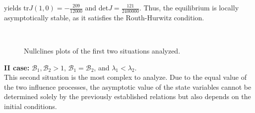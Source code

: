 yields tr$J(1,0) = -\frac{209}{12000}$ and det$J = \frac{121}{2400000}$. Thus, the equilibrium is locally asymptotically stable, as it satisfies the Routh-Hurwitz condition.

\begin{figure}[h]
	\centering
	 \quad
	 \\
	\caption[Nullclines first figure]{Nullclines plots of the first two situations analyzed.}
	\label{fig:r1r2less1dyn}
\end{figure}

\noindent\textbf{II case: } $\mathcal{B}_1, \mathcal{B}_2 >1$, $\mathcal{B}_1 =  \mathcal{B}_2$, and $\lambda_1 < \lambda_2$.\\
This second situation is the most complex to analyze. Due to the equal value of the two influence processes, the asymptotic value of the state variables cannot be determined solely by the previously established relations but also depends on the initial conditions.

